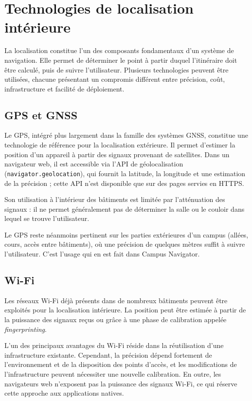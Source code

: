 \documentclass[12pt,a4paper]{report}
\begin{document}
\section{Technologies de localisation intérieure}

La localisation constitue l'un des composants fondamentaux d'un système de navigation. Elle
permet de déterminer le point à partir duquel l'itinéraire doit être calculé, puis de suivre
l'utilisateur. Plusieurs technologies peuvent être utilisées, chacune présentant un compromis
différent entre précision, coût, infrastructure et facilité de déploiement.

\subsection{GPS et GNSS}

Le GPS, intégré plus largement dans la famille des systèmes GNSS, constitue une technologie de
référence pour la localisation extérieure. Il permet d'estimer la position d'un appareil à partir
des signaux provenant de satellites. Dans un navigateur web, il est accessible via l'API de
géolocalisation (\texttt{navigator.geolocation}), qui fournit la latitude, la longitude et une
estimation de la précision ; cette API n'est disponible que sur des pages servies en HTTPS.

Son utilisation à l'intérieur des bâtiments est limitée par l'atténuation des signaux : il ne
permet généralement pas de déterminer la salle ou le couloir dans lequel se trouve l'utilisateur.

Le GPS reste néanmoins pertinent sur les parties extérieures d'un campus (allées, cours, accès
entre bâtiments), où une précision de quelques mètres suffit à suivre l'utilisateur. C'est
l'usage qui en est fait dans Campus Navigator.

\subsection{Wi-Fi}

Les réseaux Wi-Fi déjà présents dans de nombreux bâtiments peuvent être exploités pour la
localisation intérieure. La position peut être estimée à partir de la puissance des signaux reçus
ou grâce à une phase de calibration appelée \emph{fingerprinting}.

L'un des principaux avantages du Wi-Fi réside dans la réutilisation d'une infrastructure
existante. Cependant, la précision dépend fortement de l'environnement et de la disposition des
points d'accès, et les modifications de l'infrastructure peuvent nécessiter une nouvelle
calibration. En outre, les navigateurs web n'exposent pas la puissance des signaux Wi-Fi, ce qui
réserve cette approche aux applications natives.
\end{document}
